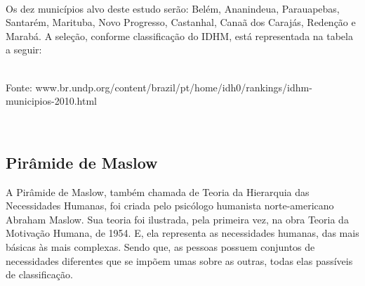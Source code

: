 \documentclass[a4paper, 10pt]{article}
\begin{document}
    \\
    Os dez municípios alvo deste estudo serão: Belém, Ananindeua, Parauapebas, Santarém, Marituba, Novo Progresso, Castanhal, Canaã dos Carajás, Redenção e Marabá. A seleção, conforme classificação do IDHM, está representada na tabela a seguir:
    \\
        \begin{table}[H]
    \centering
	     \caption{\centering Municípios paraenses que apresentaram melhor IDHM em 2010.}
	\\ 
	Fonte: www.br.undp.org/content/brazil/pt/home/idh0/rankings/idhm-municipios-2010.html
	
	   \label{tab:my_label}
	\end{table} 
	
	\\
    \subsection{Pirâmide de Maslow}
     
     A Pirâmide de Maslow, também chamada de Teoria da Hierarquia das Necessidades Humanas, foi criada pelo psicólogo humanista norte-americano Abraham Maslow. Sua teoria foi ilustrada, pela primeira vez, na obra Teoria da Motivação Humana, de 1954. E, ela representa as necessidades humanas, das mais básicas às mais complexas. Sendo que, as pessoas possuem conjuntos de necessidades diferentes que se impõem umas sobre as outras, todas elas passíveis de classificação.
     
\end{document}
